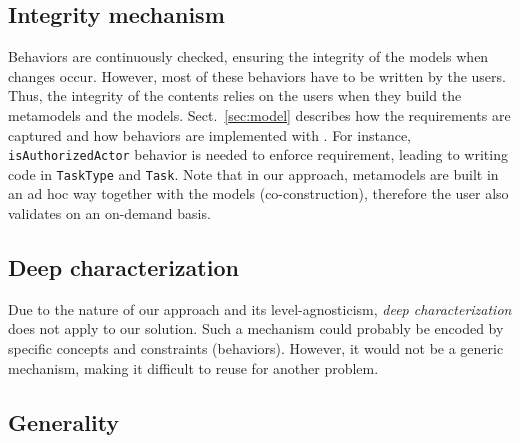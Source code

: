 

  \subsection{Integrity mechanism}


  Behaviors are continuously checked, ensuring the integrity of the models when
  changes occur. However, most of these behaviors have to be written by the
  users. Thus, the integrity of the contents relies on the users when they
  build the metamodels and the models. Sect.~\ref{sec:model} describes
  how the requirements are captured and how behaviors are implemented with
  \FML. For instance, \texttt{isAuthorizedActor} behavior is needed to enforce
   requirement, leading to writing \FML code in \texttt{TaskType}
  and \texttt{Task}. Note that in our approach, metamodels are built in an
 ad hoc way together with the models (co-construction), therefore the user
  also validates on an on-demand basis.

  \subsection{Deep characterization}



  Due to the nature of our approach and its level-agnosticism, \emph{deep
  characterization} does not apply to our solution. Such a mechanism could
  probably be encoded by specific concepts and constraints (behaviors).
  However, it would not be a generic mechanism, making it difficult to reuse
  for another problem.

  \subsection{Generality}



